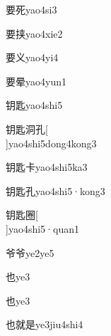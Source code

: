 \begin{verbete}[9;6]{要死}{yao4si3}
\end{verbete}

\begin{verbete}[9;9]{要挟}{yao4xie2}
\end{verbete}

\begin{verbete}[9;3]{要义}{yao4yi4}
\end{verbete}

\begin{verbete}[9;10]{要晕}{yao4yun1}
\end{verbete}

\begin{verbete}[9;11]{钥匙}{yao4shi5}
\end{verbete}

\begin{verbete}[9;11;9;4]{钥匙洞孔}[\\]{yao4shi5dong4kong3}
\end{verbete}

\begin{verbete}[9;11;11]{钥匙卡}{yao4shi5ka3}
\end{verbete}

\begin{verbete}[9;11;4]{钥匙孔}{yao4shi5·kong3}
\end{verbete}

\begin{verbete}[9;11;11]{钥匙圈}[\\]{yao4shi5·quan1}
\end{verbete}

\begin{verbete}[6;6]{爷爷}{ye2ye5}
\end{verbete}

\begin{verbete}[3]{也}{ye3}
\end{verbete}
\begin{verbete*}[3]{也}{ye3}
\end{verbete*}

\begin{verbete}[3;12;9]{也就是}{ye3jiu4shi4}
\end{verbete}

